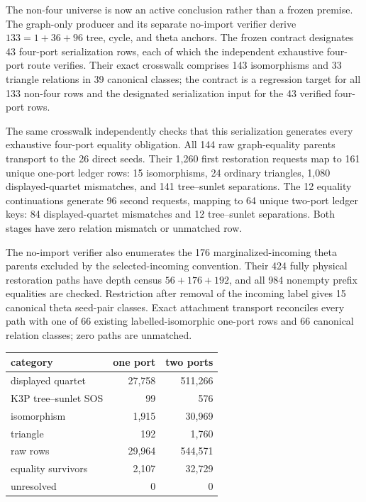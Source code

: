 \documentclass[10pt]{article}
\begin{document}
The non-four universe is now an active conclusion rather than a frozen
premise.  The graph-only producer and its separate no-import verifier derive
\(133=1+36+96\) tree, cycle, and theta anchors.  The frozen contract designates
43 four-port serialization rows, each of which the independent exhaustive
four-port route verifies.  Their exact crosswalk comprises 143 isomorphisms
and 33 triangle relations in 39 canonical classes; the contract is a
regression target for all 133 non-four rows and the designated serialization
input for the 43 verified four-port rows.

The same crosswalk independently checks that this serialization generates
every exhaustive four-port equality obligation.  All 144 raw graph-equality
parents transport to the 26 direct seeds.  Their 1,260 first restoration
requests map to 161 unique one-port ledger rows: 15 isomorphisms, 24 ordinary
triangles, 1,080 displayed-quartet mismatches, and 141 tree--sunlet
separations.  The 12 equality continuations generate 96 second requests,
mapping to 64 unique two-port ledger keys: 84 displayed-quartet mismatches and
12 tree--sunlet separations.  Both stages have zero relation mismatch or
unmatched row.

The no-import verifier also enumerates the 176 marginalized-incoming theta
parents excluded by the selected-incoming convention.  Their 424 fully
physical restoration paths have depth census \(56+176+192\), and all 984
nonempty prefix equalities are checked.  Restriction after removal of the
incoming label gives 15 canonical theta seed-pair classes.  Exact attachment
transport reconciles every path with one of 66 existing labelled-isomorphic
one-port rows and 66 canonical relation classes; zero paths are unmatched.

\begin{center}
\begin{tabular}{lrr}
\toprule
category & one port & two ports\\
\midrule
displayed quartet & 27,758 & 511,266\\
K3P tree--sunlet SOS & 99 & 576\\
isomorphism & 1,915 & 30,969\\
triangle & 192 & 1,760\\
\midrule
raw rows & 29,964 & 544,571\\
equality survivors & 2,107 & 32,729\\
unresolved & 0 & 0\\
\bottomrule
\end{tabular}
\end{center}
\end{document}
